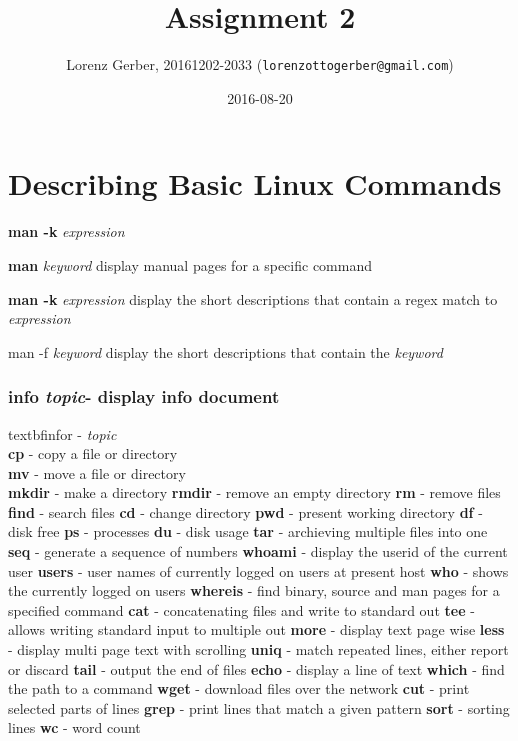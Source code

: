 \documentclass[a4paper,11pt,twoside]{article}
\title{Assignment 2}
\author{Lorenz Gerber, 20161202-2033 ({\tt{lorenzottogerber@gmail.com}})}
\date{2016-08-20}
\begin{document}
\lstset{language=C}
\maketitle
\thispagestyle{empty}
\newpage

\clearpage
{}

\section{Describing Basic Linux Commands} 

\begin{labeling}{\textbf{man -k} \textit{expression}}
\item [\textbf{man} \textit{keyword}] display manual pages for a specific command 
\item [\textbf{man -k} \textit{expression}] display the short descriptions that contain a regex match to \textit{expression}
\item [man -f \textit{keyword}] display the short descriptions that contain the \textit{keyword} 
\end{labeling}

\subsubsection{\textbf{info} \textit{topic}- display info document}
textbf{infor -} \textit{topic} \\
\textbf{cp} - copy a file or directory \\
\textbf{mv} - move a file or directory \\
\textbf{mkdir} - make a directory 
\textbf{rmdir} - remove an empty directory
\textbf{rm} - remove files
\textbf{find} - search files
\textbf{cd} - change directory
\textbf{pwd} - present working directory
\textbf{df} - disk free
\textbf{ps} - processes
\textbf{du} - disk usage
\textbf{tar} - archieving multiple files into one
\textbf{seq} - generate a sequence of numbers
\textbf{whoami} - display the userid of the current user
\textbf{users} - user names of currently logged on users at present host
\textbf{who} - shows the currently logged on users
\textbf{whereis} - find binary, source and man pages for a specified command
\textbf{cat} - concatenating files and write to standard out
\textbf{tee} - allows writing standard input to multiple out 
\textbf{more} - display text page wise
\textbf{less} - display multi page text with scrolling
\textbf{uniq} - match repeated lines, either report or discard
\textbf{tail} - output the end of files
\textbf{echo} - display a line of text
\textbf{which} - find the path to a command
\textbf{wget} - download files over the network
\textbf{cut} - print selected parts of lines
\textbf{grep} - print lines that match a given pattern
\textbf{sort} - sorting lines
\textbf{wc} - word count
\end{document}
